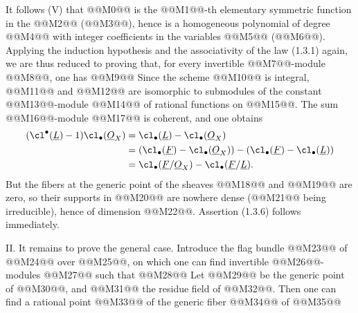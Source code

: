 
It follows (V) that @@M0@@ is the @@M1@@-th elementary symmetric function in the @@M2@@ (@@M3@@), hence is a homogeneous polynomial of degree @@M4@@ with integer coefficients in the variables @@M5@@ (@@M6@@). Applying the induction hypothesis and the associativity of the law (1.3.1) again, we are thus reduced to proving that, for every invertible @@M7@@-module @@M8@@, one has
@@M9@@
Since the scheme @@M10@@ is integral, @@M11@@ and @@M12@@ are isomorphic to submodules of the constant @@M13@@-module @@M14@@ of rational functions on @@M15@@. The sum @@M16@@-module @@M17@@ is coherent, and one obtains
\begin{align*}
(\cl^{\bullet}(\underline{L})-1)\cl_\bullet(\underline{O}_X)
&=\cl_\bullet(\underline{L})-\cl_\bullet(\underline{O}_X)\\
&=(\cl_\bullet(\underline{F})-\cl_\bullet(\underline{O}_X))-(\cl_\bullet(\underline{F})-\cl_\bullet(\underline{L}))\\
&=\cl_\bullet(\underline{F}/\underline{O}_X)-\cl_\bullet(\underline{F}/\underline{L}).
\end{align*}
But the fibers at the generic point of the sheaves @@M18@@ and @@M19@@ are zero, so their supports in @@M20@@ are nowhere dense (@@M21@@ being irreducible), hence of dimension @@M22@@. Assertion (1.3.6) follows immediately.

II. It remains to prove the general case. Introduce the flag bundle
@@M23@@
of @@M24@@ over @@M25@@, on which one can find invertible @@M26@@-modules @@M27@@ such that
@@M28@@
Let @@M29@@ be the generic point of @@M30@@, and @@M31@@ the residue field of @@M32@@. Then one can find a rational point @@M33@@ of the generic fiber @@M34@@ of @@M35@@

